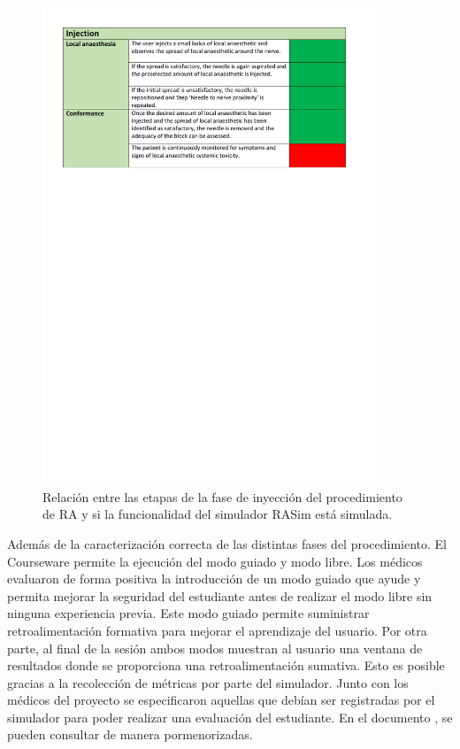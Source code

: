 \begin{figure}[ht]
    \centering
    \includegraphics[trim={1cm 19cm 1cm 1cm},clip,width=0.9\textwidth]{PDFs/RA3.pdf}
       \caption{Relación entre las etapas de la fase de inyección del procedimiento de \acs{RA} y si la funcionalidad del simulador \acs{RASim} está simulada.\label{fig:RAsteps3} }
    
\end{figure}


Además de la caracterización correcta de las distintas fases del procedimiento. El \ac{Courseware} permite la ejecución del modo guiado y modo libre. Los médicos evaluaron de forma positiva la introducción de un modo guiado que ayude y permita mejorar la seguridad del estudiante antes de realizar el modo libre sin ninguna experiencia previa. Este modo guiado permite suministrar retroalimentación formativa para mejorar el aprendizaje del usuario. Por otra parte, al final de la sesión ambos modos muestran al usuario una ventana de resultados donde se proporciona una retroalimentación sumativa. Esto es posible gracias a la recolección de métricas por parte del simulador. Junto con los médicos del proyecto se especificaron aquellas que debían ser registradas por el simulador para poder realizar una evaluación del estudiante. En el documento \cite{ded4.4}, se pueden consultar de manera pormenorizadas.

